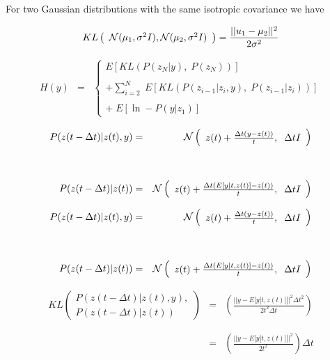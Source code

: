 {{\vfill
For two Gaussian distributions with the same isotropic covariance we have

\vfill
$$KL\left(\begin{array}{l}{\cal N}(\mu_1,\sigma^2 I), {\cal N}(\mu_2,\sigma^2 I) \end{array}\right) = \frac{||u_1 -\mu_2||^2}{2\sigma^2}$$
}

{\huge
\begin{eqnarray*}
  H(y) & = & \left\{\begin{array}{l} E[KL(P(z_N|y),\;P(z_N))] \\ \\ + \sum_{i=2}^N  \; E[KL(P(z_{i-1}|z_i,y),\;P(z_{i-1}|z_i))] \\ \\ +\;E[\ln -P(y|z_1)] \end{array}\right.
\end{eqnarray*}

\vfill
\begin{eqnarray*}
  P(z(t - \Delta t)|z(t),y) & = & {\cal N}\left(\begin{array}{l}z(t) + \frac{\Delta t(y - z(t))}{t},\;\; \Delta t I\end{array}\right) \\
  \\
  \\
  P(z(t - \Delta t)|z(t)) & = & {\cal N}\left(\begin{array}{l} z(t) + \frac{\Delta t(E[y|t,z(t)] - z(t))}{t}, \;\; \Delta t I\end{array}\right)
\end{eqnarray*}
}

{\huge
\begin{eqnarray*}
  P(z(t - \Delta t)|z(t),y) & = & {\cal N}\left(\begin{array}{l}z(t) + \frac{\Delta t(y - z(t))}{t},\;\; \Delta t I\end{array}\right) \\
  \\
  \\
  P(z(t - \Delta t)|z(t)) & = & {\cal N}\left(\begin{array}{l} z(t) + \frac{\Delta t(E[y|t,z(t)] - z(t))}{t}, \;\; \Delta t I\end{array}\right)
\end{eqnarray*}

\vfill
\begin{eqnarray*}
  KL\left(\begin{array}{l}P(z(t-\Delta t)|z(t),y), \\P(z(t-\Delta  t)|z(t))\end{array}\right)
  & = & \left(\frac{||y-E[y|t,z(t)]||^2\Delta t^2}{2t^2\Delta t}\right) \\
  \\
  \\
  & =  & \left(\frac{||y-E[y|t,z(t)]||^2}{2t^2}\right) \Delta t
\end{eqnarray*}
}

}
